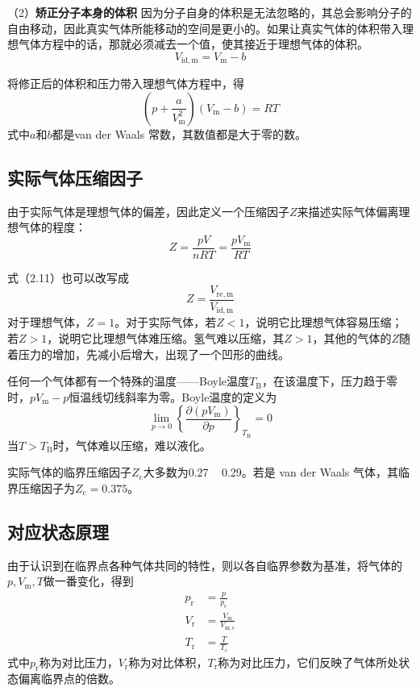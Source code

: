 \documentclass[lang=cn,newtx,11pt,scheme=chinese]{elegantbook}
\begin{document}
（2）\textbf{矫正分子本身的体积} \quad 因为分子自身的体积是无法忽略的，其总会影响分子的自由移动，因此真实气体所能移动的空间是更小的。如果让真实气体的体积带入理想气体方程中的话，那就必须减去一个值，使其接近于理想气体的体积。
\begin{equation}
	V_{\mathrm{id, m}} = V_{\mathrm{m}}-b
\end{equation}

将修正后的体积和压力带入理想气体方程中，得
\begin{equation}
	\left ( p+\frac{a}{V^2_\mathrm{m} }  \right )\left ( V_\mathrm{m}-b  \right )  =RT
\end{equation}
式中$a$和$b$都是van der Waals 常数，其数值都是大于零的数。

\subsection{实际气体压缩因子}
由于实际气体是理想气体的偏差，因此定义一个压缩因子$Z$来描述实际气体偏离理想气体的程度：
\begin{equation}
	Z = \frac{pV}{nRT}=\frac{pV_{\mathrm{m}}}{RT}
\end{equation}

式（2.11）也可以改写成
\begin{equation}
	Z = \frac{V_\mathrm{re,m}}{V_\mathrm{id,m}}
\end{equation}
对于理想气体，$Z=1$。对于实际气体，若$Z<1$，说明它比理想气体容易压缩；若$Z>1$，说明它比理想气体难压缩。氢气难以压缩，其$Z>1$，其他的气体的$Z$随着压力的增加，先减小后增大，出现了一个凹形的曲线。

任何一个气体都有一个特殊的温度——Boyle温度$T_\mathrm{B}$，在该温度下，压力趋于零时，$pV_\mathrm{m}-p$恒温线切线斜率为零。Boyle温度的定义为
\begin{equation}
	\lim_{p \to 0} \left \{ \frac{\partial (pV_\mathrm{m} )}{\partial p}  \right \}_{T_\mathrm{B} }=0
\end{equation}
当$T>T_\mathrm{B}$时，气体难以压缩，难以液化。

实际气体的临界压缩因子$Z_\mathrm{c}$大多数为0.27 ~ 0.29。若是 van der Waals 气体，其临界压缩因子为$Z_\mathrm{c}=0.375$。

\subsection{对应状态原理}
由于认识到在临界点各种气体共同的特性，则以各自临界参数为基准，将气体的$p,V_\mathrm{m},T$做一番变化，得到
\begin{equation}
	\begin{aligned}
		p_\mathrm{r} &= \frac{p}{p_\mathrm{c}} \\[1.5ex]
		V_\mathrm{r} &= \frac{V_\mathrm{m}}{V_\mathrm{m,c}} \\[1.5ex]
		T_\mathrm{r} &= \frac{T}{T_\mathrm{c}} 
	\end{aligned}
\end{equation}
式中$p_\mathrm{r}$称为对比压力，$V_\mathrm{r}$称为对比体积，$T_\mathrm{r}$称为对比压力，它们反映了气体所处状态偏离临界点的倍数。
\end{document}
